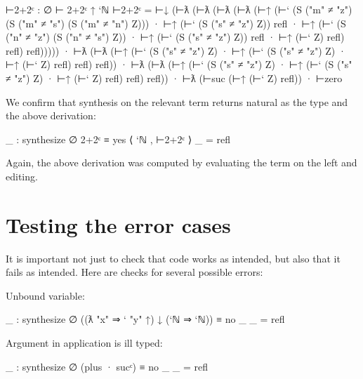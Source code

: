 \begin{fence}
\begin{code}
⊢2+2ᶜ : ∅ ⊢ 2+2ᶜ ↑ `ℕ
⊢2+2ᶜ =
  ⊢↓
  (⊢ƛ
   (⊢ƛ
    (⊢ƛ
     (⊢ƛ
      (⊢↑
       (⊢`
        (S ("m" ≠ "z")
         (S ("m" ≠ "s")
          (S ("m" ≠ "n") Z)))
        · ⊢↑ (⊢` (S ("s" ≠ "z") Z)) refl
        ·
        ⊢↑
        (⊢`
         (S ("n" ≠ "z")
          (S ("n" ≠ "s") Z))
         · ⊢↑ (⊢` (S ("s" ≠ "z") Z)) refl
         · ⊢↑ (⊢` Z) refl)
        refl)
       refl)))))
  ·
  ⊢ƛ
  (⊢ƛ
   (⊢↑
    (⊢` (S ("s" ≠ "z") Z) ·
     ⊢↑ (⊢` (S ("s" ≠ "z") Z) · ⊢↑ (⊢` Z) refl)
     refl)
    refl))
  ·
  ⊢ƛ
  (⊢ƛ
   (⊢↑
    (⊢` (S ("s" ≠ "z") Z) ·
     ⊢↑ (⊢` (S ("s" ≠ "z") Z) · ⊢↑ (⊢` Z) refl)
     refl)
    refl))
  · ⊢ƛ (⊢suc (⊢↑ (⊢` Z) refl))
  · ⊢zero
\end{code}
\end{fence}

We confirm that synthesis on the relevant term returns natural as the
type and the above derivation:

\begin{fence}
\begin{code}
_ : synthesize ∅ 2+2ᶜ ≡ yes ⟨ `ℕ , ⊢2+2ᶜ ⟩
_ = refl
\end{code}
\end{fence}

Again, the above derivation was computed by evaluating the term on the
left and editing.

\hypertarget{testing-the-error-cases}{%
\section{Testing the error cases}\label{testing-the-error-cases}}

It is important not just to check that code works as intended, but also
that it fails as intended. Here are checks for several possible errors:

Unbound variable:

\begin{fence}
\begin{code}
_ : synthesize ∅ ((ƛ "x" ⇒ ` "y" ↑) ↓ (`ℕ ⇒ `ℕ)) ≡ no _
_ = refl
\end{code}
\end{fence}

Argument in application is ill typed:

\begin{fence}
\begin{code}
_ : synthesize ∅ (plus · sucᶜ) ≡ no _
_ = refl
\end{code}
\end{fence}

